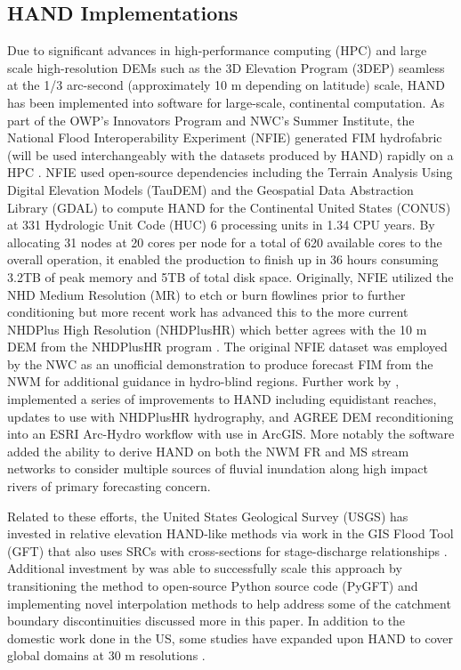 \documentclass[draft]{dependencies/agujournal2019}
\begin{document}
\subsection{HAND Implementations}
%
Due to significant advances in high-performance computing (HPC) and large scale high-resolution DEMs such as the 3D Elevation Program (3DEP) seamless at the 1/3 arc-second (approximately 10 m depending on latitude) scale, HAND has been implemented into software for large-scale, continental computation. 
As part of the OWP's Innovators Program and NWC's Summer Institute, the National Flood Interoperability Experiment (NFIE) generated FIM hydrofabric (will be used interchangeably with the datasets produced by HAND) rapidly on a HPC \cite{maidment2017conceptual,liu2016cybergis}. 
NFIE used open-source dependencies including the Terrain Analysis Using Digital Elevation Models (TauDEM) \cite{tarboton2005terrain} and the Geospatial Data Abstraction Library (GDAL) \cite{warmerdam2008geospatial} to compute HAND for the Continental United States (CONUS) at 331 Hydrologic Unit Code (HUC) 6 processing units in 1.34 CPU years.
By allocating 31 nodes at 20 cores per node for a total of 620 available cores to the overall operation, it enabled the production to finish up in 36 hours consuming 3.2TB of peak memory and 5TB of total disk space.
Originally, NFIE utilized the NHD Medium Resolution (MR) to etch or burn flowlines prior to further conditioning but more recent work has advanced this to the more current NHDPlus High Resolution (NHDPlusHR) which better agrees with the 10 m DEM from the NHDPlusHR program \cite{liu2020height}. 
The original NFIE dataset was employed by the NWC as an unofficial demonstration to produce forecast FIM from the NWM for additional guidance in hydro-blind regions.
Further work by , implemented a series of improvements to HAND including equidistant reaches, updates to use with NHDPlusHR hydrography, and AGREE DEM reconditioning \cite{hellweger1997agree} into an ESRI Arc-Hydro workflow with use in ArcGIS. 
More notably the software added the ability to derive HAND on both the NWM FR and MS stream networks to consider multiple sources of fluvial inundation along high impact rivers of primary forecasting concern.

Related to these efforts, the United States Geological Survey (USGS) has invested in relative elevation HAND-like methods via work in the GIS Flood Tool (GFT) that also uses SRCs with cross-sections for stage-discharge relationships \cite{verdin2016software}.
Additional investment by  was able to successfully scale this approach by transitioning the method to open-source Python source code (PyGFT) and implementing novel interpolation methods to help address some of the catchment boundary discontinuities discussed more in this paper.
In addition to the domestic work done in the US, some studies have expanded upon HAND to cover global domains at 30 m resolutions \cite{yamazaki2019merit,donchyts2016global}.
%
\end{document}
